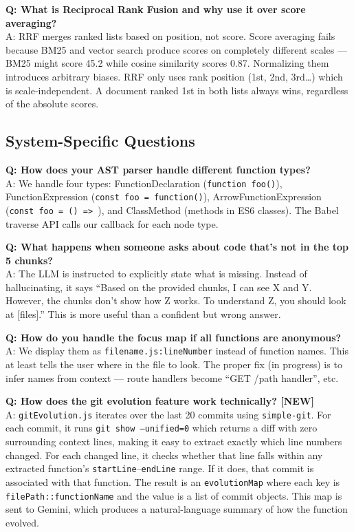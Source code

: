 \documentclass[a4paper,11pt]{article}
\begin{document}
\vspace{8pt}
\textbf{Q: What is Reciprocal Rank Fusion and why use it over score averaging?}\\[3pt]
A: RRF merges ranked lists based on position, not score. Score averaging fails because BM25 and vector search produce scores on completely different scales --- BM25 might score 45.2 while cosine similarity scores 0.87. Normalizing them introduces arbitrary biases. RRF only uses rank position (1st, 2nd, 3rd\ldots) which is scale-independent. A document ranked 1st in both lists always wins, regardless of the absolute scores.

\subsection{System-Specific Questions}

\textbf{Q: How does your AST parser handle different function types?}\\[3pt]
A: We handle four types: FunctionDeclaration (\texttt{function foo(){}}), FunctionExpression (\texttt{const foo = function(){}}), ArrowFunctionExpression (\texttt{const foo = () => {}}), and ClassMethod (methods in ES6 classes). The Babel traverse API calls our callback for each node type.

\vspace{8pt}
\textbf{Q: What happens when someone asks about code that's not in the top 5 chunks?}\\[3pt]
A: The LLM is instructed to explicitly state what is missing. Instead of hallucinating, it says ``Based on the provided chunks, I can see X and Y. However, the chunks don't show how Z works. To understand Z, you should look at [files].'' This is more useful than a confident but wrong answer.

\vspace{8pt}
\textbf{Q: How do you handle the focus map if all functions are anonymous?}\\[3pt]
A: We display them as \texttt{filename.js:lineNumber} instead of function names. This at least tells the user where in the file to look. The proper fix (in progress) is to infer names from context --- route handlers become ``GET /path handler'', etc.

\vspace{8pt}
\textbf{Q: How does the git evolution feature work technically? \textbf{[NEW]}}\\[3pt]
A: \texttt{gitEvolution.js} iterates over the last 20 commits using \texttt{simple-git}. For each commit, it runs \texttt{git show --unified=0} which returns a diff with zero surrounding context lines, making it easy to extract exactly which line numbers changed. For each changed line, it checks whether that line falls within any extracted function's \texttt{startLine}--\texttt{endLine} range. If it does, that commit is associated with that function. The result is an \texttt{evolutionMap} where each key is \texttt{filePath::functionName} and the value is a list of commit objects. This map is sent to Gemini, which produces a natural-language summary of how the function evolved.
\end{document}
